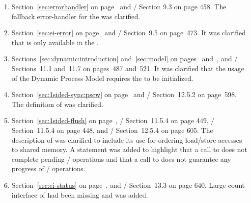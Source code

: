 \begin{enumerate}
\item
  Section~\ref{sec:errorhandler} on page~\pageref{sec:errorhandler} and \MPIIVDOTO/ Section 9.3 on page 458.
  \newline
  The fallback error-handler for the \spm{} was clarified.

\item
  Section~\ref{sec:ei-error} on page~\pageref{sec:ei-error} and \MPIIVDOTO/ Section~9.5 on page~473.
  \newline
  It was clarified that  is only available in the \wpm{}.

\item
  Sections~\ref{sec:dynamic:introduction} and~\ref{sec:model} on pages~\pageref{sec:dynamic:introduction} and~\pageref{sec:model},
  and \MPIIVDOTO/ Sections~11.1 and~11.7 on pages~487 and~521.
  \newline
  It was clarified that the usage of the Dynamic Process Model requires the \wpm{} to be initialized.

\item
  Section~\ref{sec:1sided-sync:pscw} on page~\pageref{sec:1sided-sync:pscw}  and \MPIIV/ Section~12.5.2 on page~598.
  \newline
  The definition of  was clarified.

\item {}
Section~\ref{sec:1sided-flush} on page~\pageref{sec:1sided-flush}, \MPIIII/ Section~11.5.4 on page 449, \MPIIIIDOTI/ Section~11.5.4 on page 448, and \MPIIV/ Section~12.5.4 on page 605.
\newline
The description of  was clarified to include its use for ordering load/store accesses to shared memory.
A statement was added to highlight that a call to  does not complete pending \RMA/ operations and
that a call to  does not guarantee any progress of \MPI/ operations.

\item 
  Section~\ref{sec:ei-status} on page~\pageref{sec:ei-status}, and \MPIIV/ Section~13.3 on page 640.
\newline
  Large count interface of  had been missing and was added.


\end{enumerate}
